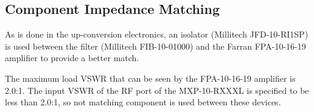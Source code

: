 \documentclass[12pt,letterpaper]{article}
\begin{document}
\subsection{Component Impedance Matching}

As is done in the up-conversion electronics, an isolator (Millitech
JFD-10-RI1SP) is used between the filter (Millitech FIB-10-01000) and
the Farran FPA-10-16-19 amplifier to provide a better match.

The maximum load VSWR that can be seen by the FPA-10-16-19 amplifier
is 2.0:1. The input VSWR of the RF port of the MXP-10-RXXXL is
specified to be less than 2.0:1, so not matching component is used
between these devices.

%
%
\end{document}
